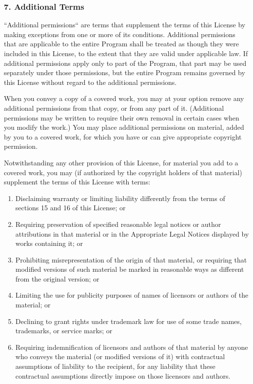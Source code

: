 \documentclass[a4paper, 11pt, twoside]{article}
\begin{document}
\subsubsection{7. Additional Terms}

“Additional permissions“ are terms that supplement the terms of this License by making exceptions from one or more of its conditions. Additional permissions that are applicable to the entire Program shall be treated as though they were included in this License, to the extent that they are valid under applicable law. If additional permissions apply only to part of the Program, that part may be used separately under those permissions, but the entire Program remains governed by this License without regard to the additional permissions.

When you convey a copy of a covered work, you may at your option remove any additional permissions from that copy, or from any part of it. (Additional permissions may be written to require their own removal in certain cases when you modify the work.) You may place additional permissions on material, added by you to a covered work, for which you have or can give appropriate copyright permission.

Notwithstanding any other provision of this License, for material you add to a covered work, you may (if authorized by the copyright holders of that material) supplement the terms of this License with terms:

\begin{enumerate}[label=\Alph*)]
\item Disclaiming warranty or limiting liability differently from the terms of sections 15 and 16 of this License; or
\item Requiring preservation of specified reasonable legal notices or author attributions in that material or in the Appropriate Legal Notices displayed by works containing it; or
\item Prohibiting misrepresentation of the origin of that material, or requiring that modified versions of such material be marked in reasonable ways as different from the original version; or
\item Limiting the use for publicity purposes of names of licensors or authors of the material; or
\item Declining to grant rights under trademark law for use of some trade names, trademarks, or service marks; or
\item Requiring indemnification of licensors and authors of that material by anyone who conveys the material (or modified versions of it) with contractual assumptions of liability to the recipient, for any liability that these contractual assumptions directly impose on those licensors and authors.
\end{enumerate}
\end{document}
